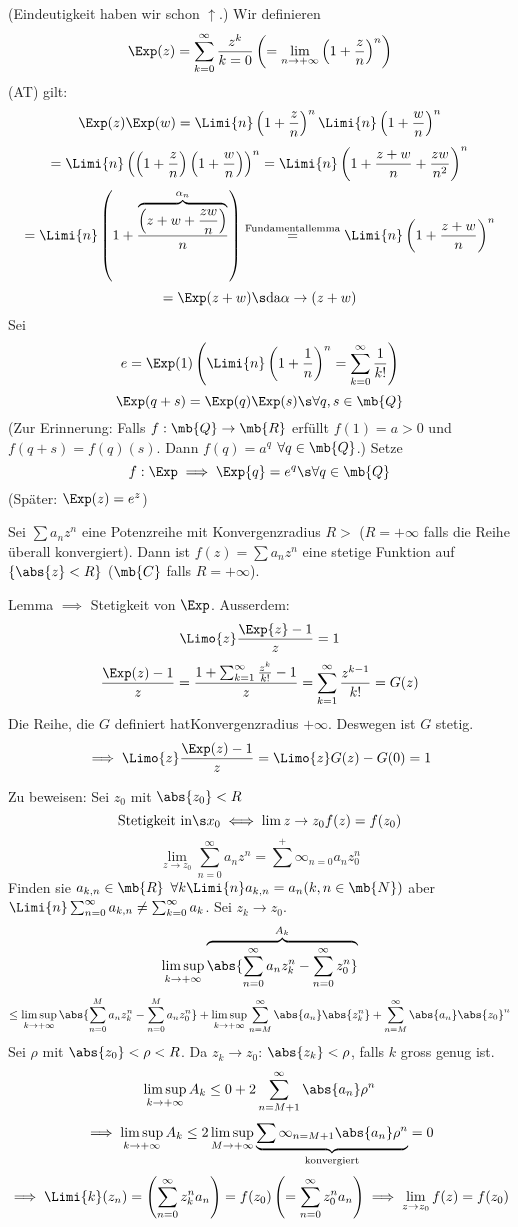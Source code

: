 \begin{Bew}
  (Eindeutigkeit haben wir schon $\uparrow$.) Wir definieren
  \[\Exp(z)=\sum^\infty_{k=0}\frac{z^k}{k=0}\left( =\lim_{n\to+\infty}\left( 1+\frac{z}{n} \right)^n \right)\]
  (AT) gilt:
  \[\Exp(z)\Exp(w)=\Limi{n}\left( 1+\frac{z}{n} \right)^n\Limi{n}\left( 1+\frac{w}{n} \right)^n\]
  \[=\Limi{n}\left( \left( 1+\frac{z}{n} \right)\left( 1+\frac{w}{n} \right) \right)^n=\Limi{n}\left( 1+\frac{z+w}{n}+\frac{zw}{n^2} \right)^n\]
  \[=\Limi{n}\left( 1+\frac{\overbrace{\left( z+w+\frac{zw}{n} \right)}^{\alpha_n}}{n} \right)\stackrel{\text{Fundamentallemma}}{=}\Limi{n}\left( 1+\frac{z+w}{n} \right)^n\]
  \[=\Exp(z+w)\s\text{da} \alpha\to(z+w)\]
  Sei
  \[e=\Exp(1)\left( \Limi{n}\left( 1+\frac{1}{n} \right)^n =\sum^\infty_{k=0}\frac{1}{k!}\right)\]
  \[\Exp(q+s)=\Exp(q)\Exp(s)\s\forall q,s\in\mb{Q}\]
  (Zur Erinnerung: Falls $f:\mb{Q}\to\mb{R}$ erfüllt $f(1)=a>0$ und $f(q+s)=f(q)(s)$. Dann $f(q)=a^q$ $\forall q\in\mb{Q}$.) Setze
  \[f:\Exp\implies\Exp{q}=e^q\s\forall q\in\mb{Q}\]
  (Später: $\Exp(z)=e^z$)
\end{Bew}
\begin{Lem}
  Sei $\sum a_nz^n$ eine Potenzreihe mit Konvergenzradius $R>$ ($R=+\infty$ falls die Reihe überall konvergiert). Dann ist $f(z)=\sum a_nz^n$ eine stetige Funktion auf $\left\{ \abs{z}<R \right\}$ ($\mb{C}$ falls $R=+\infty$).
\end{Lem}
\begin{Bem}
  Lemma $\implies$ Stetigkeit von $\Exp$. Ausserdem:
  \[\Limo{z}\frac{\Exp{z}-1}{z}=1\]
  \[\frac{\Exp(z)-1}{z}=\frac{1+\sum^\infty_{k=1}\frac{z^k}{k!}-1}{z}=\sum^\infty_{k=1}\frac{z^{k-1}}{k!}=G(z)\]
  Die Reihe, die $G$ definiert hatKonvergenzradius $+\infty$. Deswegen ist $G$ stetig.
  \[\implies\Limo{z}\frac{\Exp(z)-1}{z}=\Limo{z}G(z)-G(0)=1\]
\end{Bem}
\begin{Bew}
  Zu beweisen: Sei $z_0$ mit $\abs{z_0}<R$
  \[\text{Stetigkeit in}\s x_0\iff \lim{z\to z_0}f(z)=f(z_0)\]
  \[\lim_{z\to z_0}\sum^\infty_{n=0}a_nz^n=\sum^+\infty_{n=0}a_nz^n_0\]
  Finden sie $a_{k,n}\in\mb{R}$ $\forall k\Limi{n}a_{k,n}=a_n (k,n\in\mb{N})$ aber $\Limi{n}\sum^\infty_{n=0}a_{k,n}\neq\sum^\infty_{k=0}a_k$. Sei $z_k\to z_0$.
  \[\limsup_{k\to+\infty}\overbrace{\abs{\sum^\infty_{n=0}a_nz_k^n-\sum^\infty_{n=0}z^n_0}}^{A_k}\]
  \[\leq\limsup_{k\to+\infty}\abs{\sum^M_{n=0}a_nz_k^n-\sum^M_{n=0}a_nz^n_0}+\limsup_{k\to+\infty}\sum^\infty_{n=M}\abs{a_n}\abs{z^n_k}+\sum^\infty_{n=M}\abs{a_n}\abs{z_0}^n\]
  Sei $\rho$ mit $\abs{z_0}<\rho<R$. Da $z_k\to z_0$: $\abs{z_k}<\rho$, falls $k$ gross genug ist.
  \[\limsup_{k\to+\infty}A_k\leq 0+2\sum^\infty_{n=M+1}\abs{a_n}\rho^n\]
  \[\implies\limsup_{k\to+\infty}A_k\leq 2\limsup_{M\to+\infty}\underbrace{\sum\infty_{n=M+1}\abs{a_n}\rho^n}_{\text{konvergiert}}=0\]
  \[\implies\Limi{k}(z_n)=\left( \sum^\infty_{n=0}z_k^na_n \right)=f(z_0)\left( =\sum^\infty_{n=0}z_0^na_n \right)\implies \lim_{z\to z_0}f(z)=f(z_0)\]
\end{Bew}
